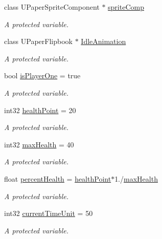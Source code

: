 \begin{DoxyCompactItemize}
\item 
class U\+Paper\+Sprite\+Component $\ast$ \hyperlink{class_a_unit2_d_a03b2c6b3e63c261e81b5a193ed0d4acd}{sprite\+Comp}
\begin{DoxyCompactList}\small\item\em A protected variable. \end{DoxyCompactList}\item 
class U\+Paper\+Flipbook $\ast$ \hyperlink{class_a_unit2_d_a1c7ee8387eeb37c2c1f735b61135865d}{Idle\+Animation}
\begin{DoxyCompactList}\small\item\em A protected variable. \end{DoxyCompactList}\item 
bool \hyperlink{class_a_unit2_d_ab916af70c15214293b1f868ef61538e2}{is\+Player\+One} = true
\begin{DoxyCompactList}\small\item\em A protected variable. \end{DoxyCompactList}\item 
int32 \hyperlink{class_a_unit2_d_a251c25f80c0fe087b892d82baf8cfa0d}{health\+Point} = 20
\begin{DoxyCompactList}\small\item\em A protected variable. \end{DoxyCompactList}\item 
int32 \hyperlink{class_a_unit2_d_a7c93157ba7198cdb15bde2e3b649988d}{max\+Health} = 40
\begin{DoxyCompactList}\small\item\em A protected variable. \end{DoxyCompactList}\item 
float \hyperlink{class_a_unit2_d_a731e52449dba6368b509b78ac95c0dc0}{percent\+Health} = \hyperlink{class_a_unit2_d_a251c25f80c0fe087b892d82baf8cfa0d}{health\+Point}$\ast$1./\hyperlink{class_a_unit2_d_a7c93157ba7198cdb15bde2e3b649988d}{max\+Health}
\begin{DoxyCompactList}\small\item\em A protected variable. \end{DoxyCompactList}\item 
int32 \hyperlink{class_a_unit2_d_a24f6252522a9d97f9ea8ea9cbf6cca69}{current\+Time\+Unit} = 50
\begin{DoxyCompactList}\small\item\em A protected variable. \end{DoxyCompactList}\item 

\end{DoxyCompactItemize}

